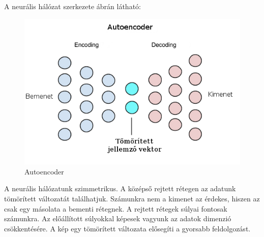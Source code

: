 A neurális hálózat szerkezete  ábrán látható:
\begin{figure}[h]
\centering
\includegraphics[scale=0.6]{images/deep_autoencoder}
\caption{Autoencoder}
\label{fig:deep_autoencoder}
\end{figure}

A neurális hálózatunk szimmetrikus. A középső rejtett rétegen az adatunk tömörített változatát találhatjuk. Számunkra nem a kimenet az érdekes, hiszen az csak egy másolata a bementi rétegnek. A rejtett rétegek súlyai fontosak számunkra. Az előállított súlyokkal képesek vagyunk az adatok dimenzió csökkentésére. A kép egy tömörített változata elősegíti a gyorsabb feldolgozást.

